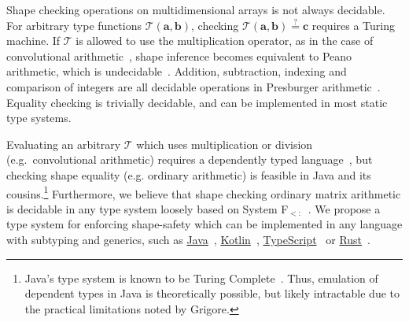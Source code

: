 \documentclass[12pt,initial,twoside,maitrise]{dms}
\numberwithin{equation}{section}
\numberwithin{table}{chapter}
\numberwithin{figure}{chapter}
\begin{document}
Shape checking operations on multidimensional arrays is not always decidable. For arbitrary type functions $\mathcal{T}(\mathbf{a}, \mathbf{b})$, checking $\mathcal{T}(\mathbf{a}, \mathbf{b}) \stackrel{?}{=} \mathbf{c}$ requires a Turing machine. If $\mathcal{T}$ is allowed to use the multiplication operator, as in the case of convolutional arithmetic~\citep{dumoulin2016guide}, shape inference becomes equivalent to Peano arithmetic, which is undecidable~\citep{godel1931formal}. Addition, subtraction, indexing and comparison of integers are all decidable operations in Presburger arithmetic~\citep{suzuki1980verification, bradley2006decidable, charlier2011enumeration}. Equality checking is trivially decidable, and can be implemented in most static type systems.

Evaluating an arbitrary $\mathcal{T}$ which uses multiplication or division (e.g.\ convolutional arithmetic) requires a dependently typed language~\citep{xi1998eliminating, pineyro2019structure}, but checking shape equality (e.g. ordinary arithmetic) is feasible in Java and its cousins.\footnote{Java's type system is known to be Turing Complete~\citep{grigore2017java}. Thus, emulation of dependent types in Java is theoretically possible, but likely intractable due to the practical limitations noted by Grigore.} Furthermore, we believe that shape checking ordinary matrix arithmetic is decidable in any type system loosely based on System F${}_{<:}$~\citep{cardelli1991extension}. We propose a type system for enforcing shape-safety which can be implemented in any language with subtyping and generics, such as \href{https://docs.oracle.com/javase/tutorial/java/generics/index.html}{Java}~\citep{naftalin2007java}, \href{https://kotlinlang.org/docs/reference/generics.html}{Kotlin}~\citep{tate2013mixed}, \href{https://www.typescriptlang.org/docs/handbook/advanced-types.html}{TypeScript}~\citep{bierman2014understanding} or \href{https://doc.rust-lang.org/1.7.0/book/generics.html}{Rust}~\citep{crozet2019nalgebra}.
\end{document}
